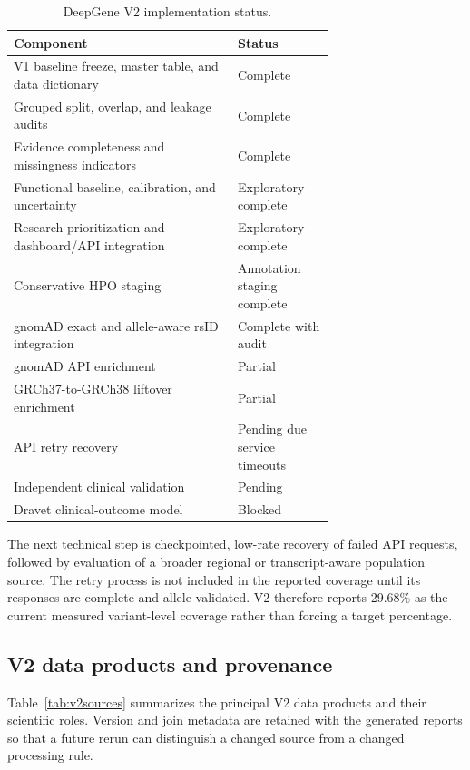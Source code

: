 \documentclass[12pt,a4paper]{article}
\begin{document}
\begin{table}[H]
\centering
\small
\caption{DeepGene V2 implementation status.}
\label{tab:v2status}
\begin{tabular}{p{0.70\linewidth}l}
\toprule
Component & Status\\
\midrule
V1 baseline freeze, master table, and data dictionary & Complete\\
Grouped split, overlap, and leakage audits & Complete\\
Evidence completeness and missingness indicators & Complete\\
Functional baseline, calibration, and uncertainty & Exploratory complete\\
Research prioritization and dashboard/API integration & Exploratory complete\\
Conservative HPO staging & Annotation staging complete\\
gnomAD exact and allele-aware rsID integration & Complete with audit\\
gnomAD API enrichment & Partial\\
GRCh37-to-GRCh38 liftover enrichment & Partial\\
API retry recovery & Pending due service timeouts\\
Independent clinical validation & Pending\\
Dravet clinical-outcome model & Blocked\\
\bottomrule
\end{tabular}
\end{table}

The next technical step is checkpointed, low-rate recovery of failed API
requests, followed by evaluation of a broader regional or transcript-aware
population source. The retry process is not included in the reported coverage
until its responses are complete and allele-validated. V2 therefore reports
29.68\% as the current measured variant-level coverage rather than forcing a
target percentage.

\subsection{V2 data products and provenance}
Table~\ref{tab:v2sources} summarizes the principal V2 data products and their
scientific roles. Version and join metadata are retained with the generated
reports so that a future rerun can distinguish a changed source from a changed
processing rule.
\end{document}
